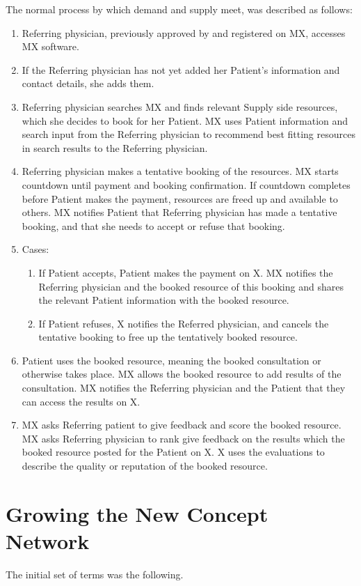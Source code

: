 \documentclass[graybox,envcountchap,sectrefs]{svmono}
\newcommand{\ncnf}{New Concept Network}
\begin{document}
The normal process by which demand and supply meet, was described as follows:
\begin{enumerate}
	\item Referring physician, previously approved by and registered on MX, accesses MX software.
	\item If the Referring physician has not yet added her Patient’s information and contact details, she adds them. 
	\item Referring physician searches MX and finds relevant Supply side resources, which she decides to book for her Patient. MX uses Patient information and search input from the Referring physician to recommend best fitting resources in search results to the Referring physician.
	\item Referring physician makes a tentative booking of the resources. MX starts countdown until payment and booking confirmation. If countdown completes before Patient makes the payment, resources are freed up and available to others.
	MX notifies Patient that Referring physician has made a tentative booking, and that she needs to accept or refuse that booking. 
	\item Cases:
		\begin{enumerate}
			\item If Patient accepts, Patient makes the payment on X. MX notifies the Referring physician and the booked resource of this booking and shares the relevant Patient information with the booked resource.
			\item If Patient refuses, X notifies the Referred physician, and cancels the tentative booking to free up the tentatively booked resource.
		\end{enumerate}
	\item Patient uses the booked resource, meaning the booked consultation or otherwise takes place. MX allows the booked resource to add results of the consultation. MX notifies the Referring physician and the Patient that they can access the results on X.
	\item MX asks Referring patient to give feedback and score the booked resource. MX asks Referring physician to rank give feedback on the results which the booked resource posted for the Patient on X. X uses the evaluations to describe the quality or reputation of the booked resource.
\end{enumerate}

\section{Growing the \ncnf}
The initial set of terms was the following.
\end{document}
